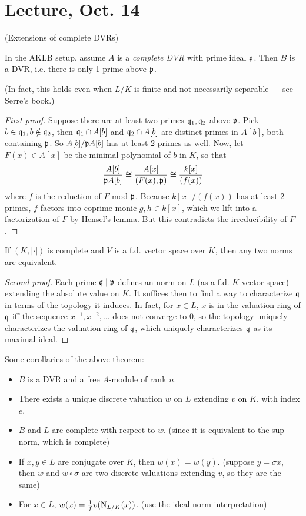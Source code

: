 \documentclass[11pt]{amsart}
\begin{document}
\section{Lecture, Oct. 14}

(Extensions of complete DVRs)

\begin{thm}
In the AKLB setup, assume $A$ is a \emph{complete DVR} with prime ideal $\mathfrak{p}$. Then $B$ is a DVR, i.e. there is only 1 prime above $\mathfrak{p}$.
\end{thm}

(In fact, this holds even when $L/K$ is finite and not necessarily separable --- see Serre's book.)

\begin{proof}[First proof]
Suppose there are at least two primes $\mathfrak{q}_1,\mathfrak{q}_2$ above $\mathfrak{p}$. Pick $b\in \mathfrak{q}_1, b\notin \mathfrak{q}_2$, then $\mathfrak{q}_1\cap A[b]$ and $\mathfrak{q}_2\cap A[b]$ are distinct primes in $A[b]$, both containing $\mathfrak{p}$. So $A[b]/\mathfrak{p} A[b]$ has at least 2 primes as well. Now, let $F(x)\in A[x]$ be the minimal polynomial of $b$ in $K$, so that
\[\frac{A[b]}{\mathfrak{p} A[b]} \cong \frac{A[x]}{(F(x),\mathfrak{p})} \cong \frac{k[x]}{(f(x))}\]
where $f$ is the reduction of $F$ mod $\mathfrak{p}$. Because $k[x]/(f(x))$ has at least 2 primes, $f$ factors into coprime monic $g, h\in k[x]$, which we lift into a factorization of $F$ by Hensel's lemma. But this contradicts the irreducibility of $F$.
\end{proof}

\begin{lem}
If $(K, |\cdot|)$ is complete and $V$ is a f.d. vector space over $K$, then any two norms are equivalent.
\end{lem}

\begin{proof}[Second proof]
Each prime $\mathfrak{q}\mid \mathfrak{p}$ defines an norm on $L$ (as a f.d. $K$-vector space) extending the absolute value on $K$. It suffices then to find a way to characterize $\mathfrak{q}$ in terms of the topology it induces. In fact, for $x\in L$, $x$ is in the valuation ring of $\mathfrak{q}$ iff the sequence $x^{-1}, x^{-2}, \dots$ does not converge to 0, so the topology uniquely characterizes the valuation ring of $\mathfrak{q}$, which uniquely characterizes $\mathfrak{q}$ as its maximal ideal.
\end{proof}

Some corollaries of the above theorem:
\begin{itemize}
    \item $B$ is a DVR and a free $A$-module of rank $n$.
    \item There exists a unique discrete valuation $w$ on $L$ extending $v$ on $K$, with index $e$.
    \item $B$ and $L$ are complete with respect to $w$. (since it is equivalent to the sup norm, which is complete)
    \item If $x,y\in L$ are conjugate over $K$, then $w(x) = w(y)$. (suppose $y=\sigma x$, then $w$ and $w\circ\sigma$ are two discrete valuations extending $v$, so they are the same)
    \item For $x\in L$, $w(x) = \frac{1}{f} v(\operatorname{N}_{L/K}(x))$. (use the ideal norm interpretation)
\end{itemize}
\end{document}
